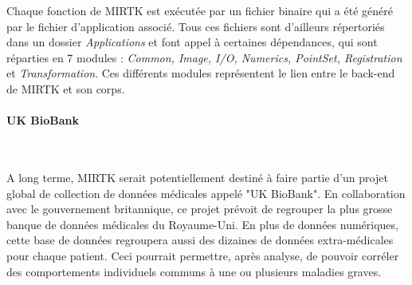 \documentclass[10pt]{report}
\begin{document}
	Chaque fonction de MIRTK est exécutée par un fichier binaire qui a été généré par le fichier d'application associé. Tous ces fichiers sont d'ailleurs répertoriés dans un dossier \textit{Applications} et font appel à certaines dépendances, qui sont réparties en 7 modules : \textit{Common, Image, I/O, Numerics, PointSet, Registration} et \textit{Transformation}. Ces différents modules représentent le lien entre le back-end de MIRTK et son corps. \\
	
	
	

	 \paragraph{UK BioBank}~\par
	  A long terme, MIRTK serait potentiellement destiné à faire partie d'un projet global de collection de données médicales appelé "UK BioBank". En collaboration avec le gouvernement britannique, ce projet prévoit de regrouper la plus grosse banque de données médicales du Royaume-Uni. En plus de données numériques, cette base de données regroupera aussi des dizaines de données extra-médicales pour chaque patient. Ceci pourrait permettre, après analyse, de pouvoir corréler des comportements individuels communs à une ou plusieurs maladies graves. 
	 
\end{document}

